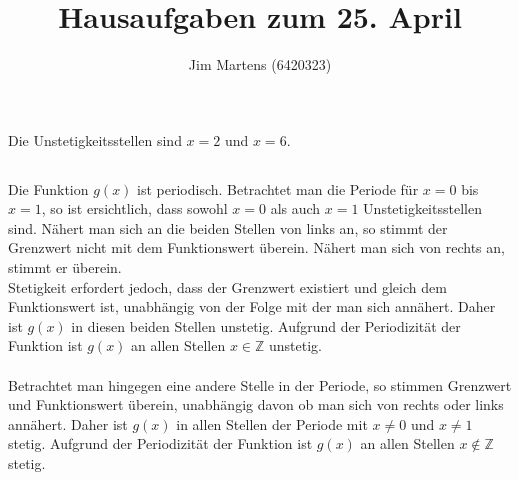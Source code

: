 \documentclass[10pt,a4paper,oneside,ngerman,numbers=noenddot]{scrartcl}
\begin{document}
\author{Jim Martens (6420323)}
\title{Hausaufgaben zum 25. April}
\maketitle
\section{} %
\subsection{} %
\vspace{11cm}
Die Unstetigkeitsstellen sind $x=2$ und $x=6$.
\subsection{} %
\vspace{4cm}
Die Funktion $g(x)$ ist periodisch. Betrachtet man die Periode für $x=0$ bis $x=1$, so ist ersichtlich, dass sowohl $x=0$ als auch $x=1$ Unstetigkeitsstellen sind. Nähert man sich an die beiden Stellen von links an, so stimmt der Grenzwert nicht mit dem Funktionswert überein. Nähert man sich von rechts an, stimmt er überein.\\
Stetigkeit erfordert jedoch, dass der Grenzwert existiert und gleich dem Funktionswert ist, unabhängig von der Folge mit der man sich annähert.
Daher ist $g(x)$ in diesen beiden Stellen unstetig. Aufgrund der Periodizität der Funktion ist $g(x)$ an allen Stellen $x \in \mathbb{Z}$ unstetig.\\
\\
Betrachtet man hingegen eine andere Stelle in der Periode, so stimmen Grenzwert und Funktionswert überein, unabhängig davon ob man sich von rechts oder links annähert. Daher ist $g(x)$ in allen Stellen der Periode mit $x \neq 0$ und $x \neq 1$ stetig. Aufgrund der Periodizität der Funktion ist $g(x)$ an allen Stellen $x \not\in \mathbb{Z}$ stetig.
\section{} %
\end{document}
